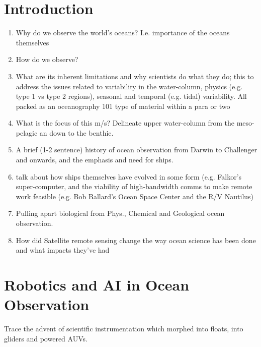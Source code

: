 \documentclass[12pt]{article}
\begin{document}
\section{Introduction}

\begin{enumerate} 

  \item Why do we observe the world's oceans? I.e. importance of the oceans
themselves

\item How do we observe?

\item What are its inherent limitations and why scientists do what
  they do; this to address the issues related to variability in the
  water-column, physics (e.g. type 1 vs type 2 regions), seasonal and
  temporal (e.g. tidal) variability. All packed as an oceanography 101
  type of material within a para or two

\item What is the focus of this m/s? Delineate upper water-column from the
meso-pelagic an down to the benthic.

\item A brief (1-2 sentence) history of ocean observation from Darwin to
Challenger and onwards, and the emphasis and need for ships.

\item talk about how ships themselves have evolved in some form
  (e.g. Falkor’s super-computer, and the viability of high-bandwidth
  comms to make remote work feasible (e.g. Bob Ballard’s Ocean Space
  Center and the R/V Nautilus)



\item Pulling apart biological from Phys., Chemical and Geological ocean
observation. 

\item How did Satellite remote sensing change the way ocean science has
been done and what impacts they've had

\end{enumerate}

\section{Robotics and AI in Ocean Observation}

Trace the advent of scientific instrumentation which morphed into
floats, into gliders and powered AUVs.
\end{document}
